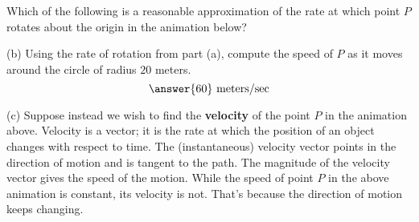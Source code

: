 \documentclass{ximera}
\begin{document}

\begin{question}   \label{Qdfg4bk:Cross}
Which of the following is a reasonable approximation of the rate at which point $P$ rotates about the origin in the animation below?
\begin{multipleChoice}  
\end{multipleChoice}  

(b) Using the rate of rotation from part (a), compute the speed of $P$ as it moves around the circle of radius $20$ meters. 
\[
   \answer{60} \text{ meters/sec}
\]

\end{question}


 
\begin{onlineOnly}
    \begin{center}
\end{center}
\end{onlineOnly}


(c) Suppose instead we wish to find the {\bf velocity} of the point $P$ in the animation above. Velocity is a vector; it is the rate at which the position of an object changes with respect to time. The (instantaneous) velocity vector points in the direction of motion and is  tangent to the path. The magnitude of the velocity vector gives the speed of the motion. While the speed of point $P$ in the above animation is constant, its velocity is not. That's because the direction of motion keeps changing.
\end{document}
